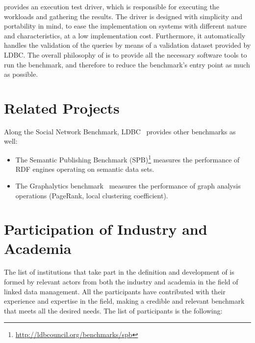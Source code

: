 \ldbcsnb provides an execution test driver, which is responsible for executing
the workloads and gathering the results. The driver is designed with simplicity
and portability in mind, to ease the implementation on systems with different
nature and characteristics, at a low implementation cost. Furthermore, it
automatically handles the validation of the queries by means of a validation
dataset provided by LDBC.  The overall philosophy of \ldbcsnb is to provide all
the necessary software tools to run the benchmark, and therefore to reduce the
benchmark's entry point as much as possible.


\section{Related Projects}

Along the Social Network Benchmark, LDBC~\cite{DBLP:journals/sigmod/AnglesBLF0ENMKT14} provides other benchmarks as well:

\begin{itemize}
	\item The Semantic Publishing Benchmark (SPB)\footnote{\url{http://ldbcouncil.org/benchmarks/spb}} measures the performance of RDF engines operating on semantic data sets.
	\item The Graphalytics benchmark~\cite{DBLP:journals/pvldb/IosupHNHPMCCSAT16} measures the performance of graph analysis operations (\eg PageRank, local clustering coefficient).
\end{itemize}


\section{Participation of Industry and Academia}

The list of institutions that take part in the definition and development
of \ldbcsnb is formed by relevant actors from both the industry and academia in
the field of linked data management. All the participants have contributed with
their experience and expertise in the field, making a credible and relevant
benchmark that meets all the desired needs. The list of participants is the
following:

